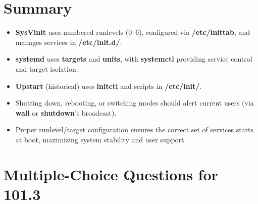 \documentclass[12pt,a4paper]{report}
\begin{document}
\section*{Summary}
\begin{itemize}
    \item \textbf{SysVinit} uses numbered runlevels (0–6), configured via \textbf{/etc/inittab}, and manages services in \textbf{/etc/init.d/}.
    \item \textbf{systemd} uses \textbf{targets} and \textbf{units}, with \textbf{systemctl} providing service control and target isolation.
    \item \textbf{Upstart} (historical) uses \textbf{initctl} and scripts in \textbf{/etc/init/}.
    \item Shutting down, rebooting, or switching modes should alert current users (via \textbf{wall} or \textbf{shutdown}’s broadcast).
    \item Proper runlevel/target configuration ensures the correct set of services starts at boot, maximizing system stability and user support.
\end{itemize}


\newpage
\section*{Multiple-Choice Questions for 101.3}
\end{document}
